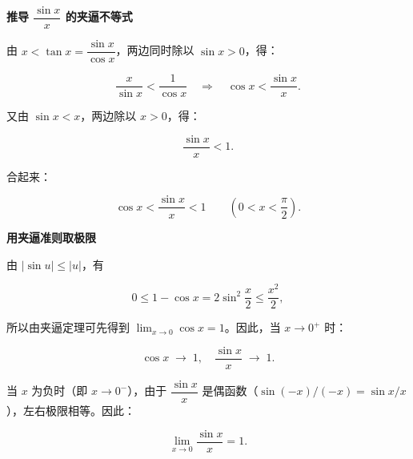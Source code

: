 \documentclass[fontset=fandol]{ctexart}
\newenvironment{custom}[1]{\par\noindent\textbf{#1}\quad}{\par\vspace{0.8em}}
\begin{document}
\begin{custom}{推导 \(\dfrac{\sin x}{x}\) 的夹逼不等式}



由 \(x < \tan x = \dfrac{\sin x}{\cos x}\)，两边同时除以 \(\sin x > 0\)，得：



\[

\dfrac{x}{\sin x} < \dfrac{1}{\cos x} \quad \Longrightarrow \quad \cos x < \dfrac{\sin x}{x}.

\]



又由 \(\sin x < x\)，两边除以 \(x > 0\)，得：



\[

\dfrac{\sin x}{x} < 1.

\]



合起来：



\[

\cos x < \dfrac{\sin x}{x} < 1 \qquad (0 < x < \dfrac{\pi}{2}).

\]



\end{custom}



\begin{custom}{用夹逼准则取极限}



由 \(|\sin u|\leq|u|\)，有

\[

0\leq1-\cos x=2\sin^2\frac x2\leq\frac{x^2}{2},

\]

所以由夹逼定理可先得到 \(\lim_{x\to0}\cos x=1\)。因此，当 \(x \to 0^+\) 时：



\[

\cos x \;\longrightarrow\; 1,\quad \dfrac{\sin x}{x} \;\longrightarrow\; 1.

\]



当 \(x\) 为负时（即 \(x \to 0^-\)），由于 \(\dfrac{\sin x}{x}\) 是偶函数（\(\sin(-x)/(-x) = \sin x / x\)），左右极限相等。因此：



\[

\lim_{x \to 0} \dfrac{\sin x}{x} = 1.

\]



\end{custom}
\end{document}
